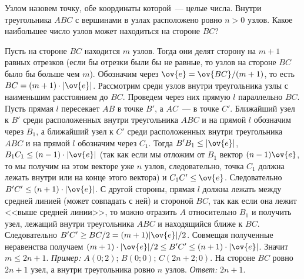 \problem
{}
Узлом назовем точку, обе координаты которой~--- целые числа.
Внутри треугольника $ABC$ с вершинами в узлах расположено ровно $n > 0$ узлов.
Какое наибольшее число узлов может находиться на стороне $BC$?

\solution
Пусть на стороне $BC$ находится $m$ узлов.
Тогда они делят сторону на $m + 1$ равных отрезков
(если бы отрезки были бы не равные, то узлов на стороне $BC$ было бы больше чем
$m$).
Обозначим через $\ov{e} = \ov{BC} / (m + 1)$, то есть
$BC = (m + 1) \cdot |\ov{e}|$.
Рассмотрим среди узлов внутри треугольника узлы с наименьшим расстоянием до
$BC$.
Проведем через них прямую $l$ параллельно $BC$.
Пусть прямая $l$ пересекает $AB$ в точке $B'$, а $AC$~--- в точке $C'$.
Ближайший узел к $B'$ среди расположенных внутри треугольника $ABC$ и на прямой
$l$ обозначим через $B_1$, а ближайший узел к $C'$ среди расположенных внутри
треугольника $ABC$ и на прямой $l$ обозначим через $C_1$.
Тогда $B'B_1 \leq |\ov{e}|$, $B_1C_1 \leq (n - 1) \cdot |\ov{e}|$
(так как если мы отложим от $B_1$ вектор $(n - 1) \ov{e}$, то мы получим на
этом векторе уже $n$ узлов, следовательно, точка $C_1$ должна лежать внутри или
на конце этого вектора)
и $C_1C' \leq \ov{e}$.
Следовательно $B'C' \leq (n + 1) \cdot |\ov{e}|$.
С другой стороны, прямая $l$ должна лежать между средней линией
(может совпадать с ней) и стороной $BC$, так как если она лежит
<<выше средней линии>>, то можно отразить $A$ относительно $B_1$ и получить
узел, лежащий внутри треугольника $ABC$ и находящийся ближе к $BC$.
Следовательно $B'C' \geq BC / 2 = (m + 1) |\ov{e}| / 2$.
Совмещая полученные неравенства получаем
$(m + 1) \cdot |\ov{e}| / 2 \leq B'C' \leq (n + 1) \cdot |\ov{e}|$.
Значит $m \leq 2 n + 1$.
\emph{Пример:} $A(0; 2)$; $B(0; 0)$; $C(2 n + 2; 0)$.
На стороне $BC$ ровно $2 n + 1$ узел, а внутри треугольника ровно $n$ узлов.
\emph{Ответ:} $2 n + 1$.

\endproblem
